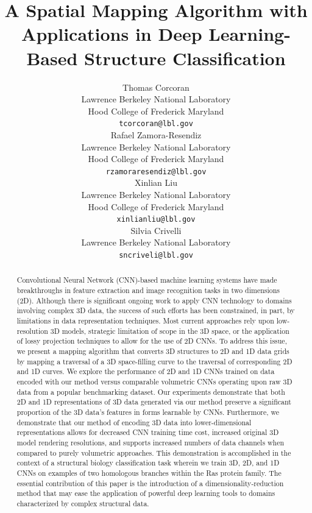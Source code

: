 \documentclass{article}
\title{A Spatial Mapping Algorithm with Applications in Deep Learning-Based Structure Classification}
\author{
  Thomas Corcoran \\
  Lawrence Berkeley National Laboratory \\
  Hood College of Frederick Maryland \\
  \texttt{tcorcoran@lbl.gov} \\
  \And
  Rafael Zamora-Resendiz \\
  Lawrence Berkeley National Laboratory \\
  Hood College of Frederick Maryland \\
  \texttt{rzamoraresendiz@lbl.gov} \\
  \And
  Xinlian Liu\\
  Lawrence Berkeley National Laboratory\\
  Hood College of Frederick Maryland \\
  \texttt{xinlianliu@lbl.gov} \\
  \And 
  Silvia Crivelli \\
  Lawrence Berkeley National Laboratory \\
  \texttt{sncriveli@lbl.gov} \\
}
\begin{document}
\maketitle

\begin{abstract}
 Convolutional Neural Network (CNN)-based machine learning systems have made breakthroughs in feature extraction and image recognition tasks in two dimensions (2D). Although there is significant ongoing work to apply CNN technology to domains involving complex 3D data, the success of such efforts has been constrained, in part, by limitations in data representation techniques. Most current approaches rely upon low-resolution 3D models, strategic limitation of scope in the 3D space, or the application of lossy projection techniques to allow for the use of 2D CNNs. To address this issue, we present a mapping algorithm that converts 3D structures to 2D and 1D data grids by mapping a traversal of a 3D space-filling curve to the traversal of corresponding 2D and 1D curves. We explore the performance of 2D and 1D CNNs trained on data encoded with our method versus comparable volumetric CNNs operating upon raw 3D data from a popular benchmarking dataset. Our experiments demonstrate that both 2D and 1D representations of 3D data generated via our method preserve a significant proportion of the 3D data's features in forms learnable by CNNs. Furthermore, we demonstrate that our method of encoding 3D data into lower-dimensional representations allows for decreased CNN training time cost, increased original 3D model rendering resolutions, and supports increased numbers of data channels when compared to purely volumetric approaches. This demonstration is accomplished in the context of a structural biology classification task wherein we train 3D, 2D, and 1D CNNs on examples of two homologous branches within the Ras protein family. The essential contribution of this paper is the introduction of a dimensionality-reduction method that may ease the application of powerful deep learning tools to domains characterized by complex structural data.
 
\end{abstract}
\end{document}

